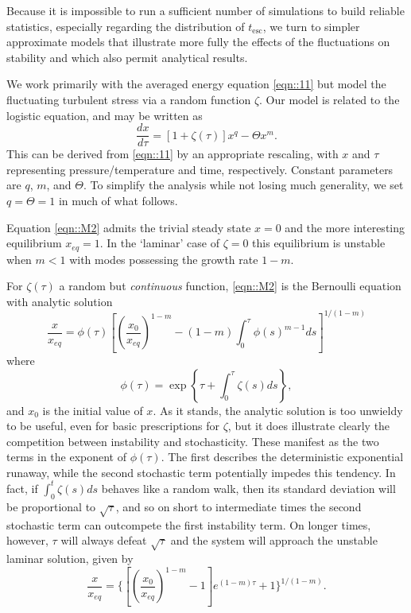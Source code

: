 \documentclass[useAMS]{mn2e}
\begin{document}
Because it is impossible to run a sufficient number of simulations to build
reliable statistics, especially regarding the distribution of $t_{\text{esc}}$,
we turn to simpler approximate models that illustrate
more fully the effects of the fluctuations on stability and which also
 permit analytical results.

We work primarily with the averaged energy equation \eqref{eqn::11}
but model the
fluctuating turbulent stress via a random function $\zeta$. Our model
is related to the logistic equation, and may be written as
\begin{equation}
\frac{dx}{d\tau}=\left[1+\zeta(\tau)\right]x^{q}-\Theta x^{m}.
\label{eqn::M2}
\end{equation}
This can be derived from \eqref{eqn::11} by an appropriate rescaling,
with $x$ and $\tau$ representing pressure/temperature and time,
respectively. Constant parameters are $q$, $m$, and $\Theta$.
To simplify the analysis while not losing much generality, we set 
$q=\Theta=1$ in much of what follows.

Equation \eqref{eqn::M2} admits the trivial steady state $x=0$ and the
more interesting equilibrium $x_{eq}=1$. In the
`laminar' case of $\zeta=0$ this equilibrium is unstable when $m<1$ 
with modes possessing the growth rate $1-m$.

For $\zeta(\tau)$ a random but \emph{continuous} function,
\eqref{eqn::M2} is the Bernoulli equation with analytic solution
\begin{dmath}\label{eq::sto}
\frac{x}{x_{eq}}=\phi(\tau)\left[\left(\frac{x_{0}}{x_{eq}}\right)^{1-m}-(1-m)\int^{\tau}_{0}\phi(s)^{m-1}ds\right]^{1/(1-m)}
\end{dmath}
where 
\begin{equation}
\phi(\tau)=\exp\left\{\tau+\int^{\tau}_{0}\zeta(s) ds\right\},
\end{equation} 
and $x_0$ is the initial value of $x$. As it stands, the analytic
solution is too unwieldy to be useful, even for basic prescriptions
for $\zeta$, but it does illustrate clearly the competition between
instability and stochasticity. These manifest as the two terms in
the exponent of $\phi(\tau)$. The first describes the deterministic 
exponential runaway, while the second stochastic term
potentially impedes this
tendency. In fact, if $\int^{t}_{0}\zeta(s)
ds$ behaves like a random walk,
then its standard deviation will be proportional to $\sqrt{\tau}$,
 and so on short to intermediate times the second stochastic term can
 outcompete the first instability term. On longer times, however,
 $\tau$ will always defeat $\sqrt{\tau}$ and the system will
approach the unstable laminar solution, given by
\begin{equation}\label{eq::det}
\frac{x}{x_{eq}}=\Bigg\{\left[\left(\frac{x_{0}}{x_{eq}}\right)^{1-m}-1\right]e^{(1-m)\tau}+1\Bigg\}^{1/(1-m)}.
\end{equation}
\end{document}
